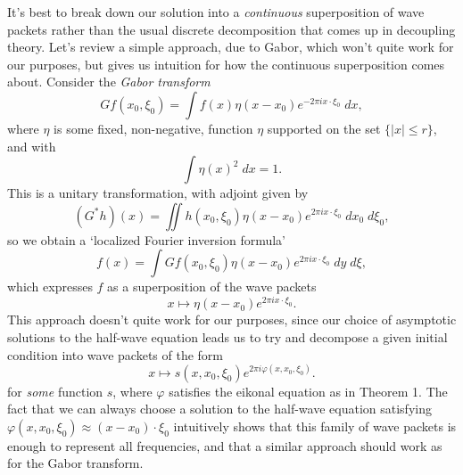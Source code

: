 \documentclass{article}
\theoremstyle{plain}
\theoremstyle{remark}
\theoremstyle{definition}
\begin{document}
It's best to break down our solution into a \emph{continuous} superposition of wave packets rather than the usual discrete decomposition that comes up in decoupling theory. Let's review a simple approach, due to Gabor, which won't quite work for our purposes, but gives us intuition for how the continuous superposition comes about. Consider the \emph{Gabor transform}
%
\[ Gf(x_0,\xi_0) = \int f(x) \eta(x - x_0) e^{- 2 \pi i x \cdot \xi_0}\; dx, \]
%
where $\eta$ is some fixed, non-negative, function $\eta$ supported on the set $\{ |x| \leq r \}$, and with
%
\[ \int \eta(x)^2\; dx = 1. \]
%
This is a unitary transformation, with adjoint given by
%
\[ (G^*h)(x) = \iint h(x_0,\xi_0) \eta(x - x_0) e^{2 \pi i x \cdot \xi_0}\; dx_0\; d\xi_0, \]
%
so we obtain a `localized Fourier inversion formula'
%
\[ f(x) = \int Gf(x_0,\xi_0) \eta(x - x_0) e^{2 \pi i x \cdot \xi_0}\; dy\; d\xi, \]
%
which expresses $f$ as a superposition of the wave packets
%
\[ x \mapsto \eta(x - x_0) e^{2 \pi i x \cdot \xi_0}. \]
%
This approach doesn't quite work for our purposes, since our choice of asymptotic solutions to the half-wave equation leads us to try and decompose a given initial condition into wave packets of the form
%
\[ x \mapsto s(x,x_0,\xi_0) e^{2 \pi i \varphi(x,x_0, \xi_0)}. \]
%
for \emph{some} function $s$, where $\varphi$ satisfies the eikonal equation as in Theorem 1. The fact that we can always choose a solution to the half-wave equation satisfying $\varphi(x,x_0,\xi_0) \approx (x - x_0) \cdot \xi_0$ intuitively shows that this family of wave packets is enough to represent all frequencies, and that a similar approach should work as for the Gabor transform.
\end{document}
